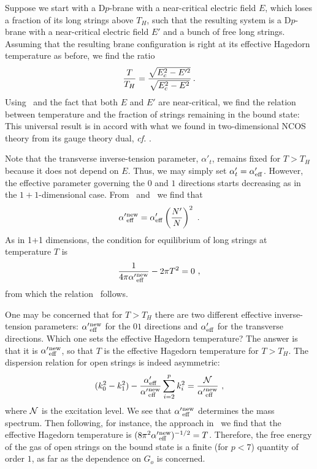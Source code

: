 Suppose we start with a D$p$-brane with a near-critical electric
field $E$, which loses a fraction of its long strings above $T_H$,
such that the resulting system is a D$p$-brane with a near-critical
electric field $E'$ and a bunch of free long strings.
Assuming that the resulting brane configuration is right at its
effective Hagedorn
temperature as before, we find the ratio
$$
{T \over T_H} = {\sqrt{E_c^2- E'^2} \over \sqrt{ E_c^2 - E^2}} \,.
$$
Using \nerel\ and the fact that both $E$ and $E'$ are near-critical,
we find the relation between temperature and the fraction of strings
remaining in the bound state:
This universal result is in accord with what we found
in two-dimensional NCOS theory from its gauge theory dual,
{\it cf.} \NuDef.

Note that the transverse inverse-tension parameter, $\alpha'_t$, remains
fixed for $T>T_H$ because it does not depend on $E$.
Thus, we may simply  set $\alpha'_t = \alpha'_{\rm eff}$.
However, the effective parameter governing the $0$ and $1$ directions
starts decreasing as in the $1+1$-dimensional case. From \scalrel\ 
and \morep\ we find that
$$ \alpha'{}_{\rm eff}^{\rm new} =  \alpha'_{\rm eff}
\left( {N'\over N} \right )^2
\ .
$$
As in 1+1 dimensions, the condition for equilibrium of long strings at
temperature $T$ is
$$ {1\over 4\pi \alpha'{}_{\rm eff}^{\rm new}} - 2\pi T^2 =0
\ ,
$$
from which the relation \boundfrac\ follows.

One may be concerned that for $T>T_H$ there are two different effective
inverse-tension parameters: $\alpha'{}_{\rm eff}^{\rm new}$ for the
$01$ directions and $ \alpha'_{\rm eff}$ for the transverse directions.
Which one sets the effective Hagedorn temperature? The answer is that
it is $\alpha'{}_{\rm eff}^{\rm new}$, so that $T$ is the effective
Hagedorn temperature for $T>T_H$. The dispersion relation for open
strings is indeed asymmetric:
$$  (k_0^2- k_1^2)-
{\alpha'_{\rm eff}\over  \alpha'{}_{\rm eff}^{\rm new}}
\sum_{i=2}^p k_i^2 = {{\cal N}\over \alpha'{}_{\rm eff}^{\rm new}}
\ ,
$$
where ${\cal N}$ is the excitation level. We see that
$\alpha'{}_{\rm eff}^{\rm new}$ determines the mass spectrum.
Then following, for instance, the approach in \znAgain\ we find
that the effective Hagedorn temperature is
$(8\pi^2 \alpha'{}_{\rm eff}^{\rm new})^{-1/2}=T$. Therefore, the
free energy of the gas of open strings on the bound state is a finite
(for $p< 7$) quantity of order $1$, as far as the dependence on $G_o$
is concerned.

